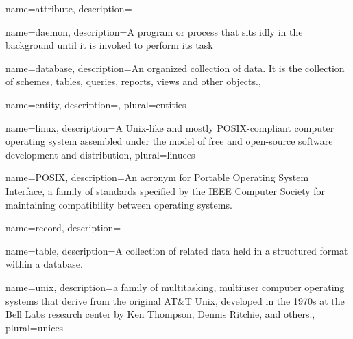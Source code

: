  {
    name=attribute,
    description={}
}

 {
    name=daemon,
    description={A program or process that sits idly in the background until it is invoked to perform its task}
}

 {
    name=database,
    description={An organized collection of data. It is the collection of schemes, tables, queries, reports, views and other objects.},
}

 {
    name=entity,
    description={},
    plural=entities
}


 {
    name=linux,
    description={A Unix-like and mostly POSIX-compliant computer operating system assembled under the model of free and open-source software development and distribution},
    plural=linuces
}


 {
    name=POSIX,
    description={An acronym for Portable Operating System Interface, a family of standards specified by the IEEE Computer Society for maintaining compatibility between operating systems.}
}

 {
    name=record,
    description={}
}

 {
    name=table,
    description={A collection of related data held in a structured format within a database.}
}


 {
    name=unix,
    description={a family of multitasking, multiuser computer operating systems that derive from the original AT\&T Unix, developed in the 1970s at the Bell Labs research center by Ken Thompson, Dennis Ritchie, and others.},
    plural=unices    
}


